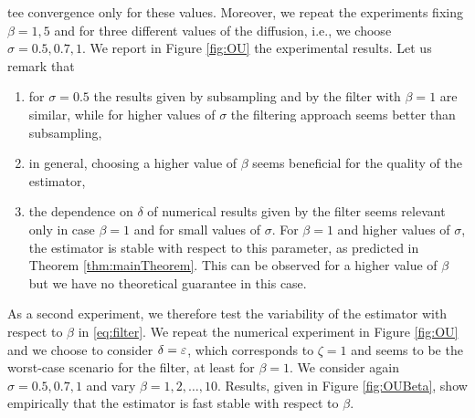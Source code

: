 \documentclass[10pt]{article}
\begin{document}
tee convergence only for these values. Moreover, we repeat the experiments fixing $\beta = 1, 5$ and for three different values of the diffusion, i.e., we choose $\sigma = 0.5, 0.7, 1$. We report in Figure \ref{fig:OU} the experimental results. Let us remark that
\begin{enumerate}
	\item for $\sigma = 0.5$ the results given by subsampling and by the filter with $\beta = 1$ are similar, while for higher values of $\sigma$ the filtering approach seems better than subsampling, 
	\item in general, choosing a higher value of $\beta$ seems beneficial for the quality of the estimator,
	\item the dependence on $\delta$ of numerical results given by the filter seems relevant only in case $\beta = 1$ and for small values of $\sigma$. For $\beta = 1$ and higher values of $\sigma$, the estimator is stable with respect to this parameter, as predicted in Theorem \ref{thm:mainTheorem}. This can be observed for a higher value of $\beta$ but we have no theoretical guarantee in this case.
\end{enumerate}

As a second experiment, we therefore test the variability of the estimator with respect to $\beta$ in \eqref{eq:filter}. We repeat the numerical experiment in Figure \ref{fig:OU} and we choose to consider $\delta = \varepsilon$, which corresponds to $\zeta = 1$ and seems to be the worst-case scenario for the filter, at least for $\beta = 1$. We consider again $\sigma = 0.5, 0.7, 1$ and vary $\beta = 1, 2, \ldots, 10$. Results, given in Figure \ref{fig:OUBeta}, show empirically that the estimator is fast stable with respect to $\beta$.
\end{document}
